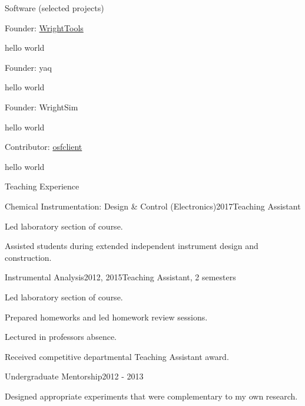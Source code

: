 \documentclass{resume}  %
\begin{document}
\begin{rSection}{Software (selected projects)}  %

\begin{rSubsection}{Founder: \href{http://wright.tools}{WrightTools}}{}{}{}
\item hello world
\end{rSubsection}

\begin{rSubsection}{Founder: yaq}{}{}{}
\item hello world
\end{rSubsection}

\begin{rSubsection}{Founder: WrightSim}{}{}{}
\item hello world
\end{rSubsection}

\begin{rSubsection}{Contributor: \href{https://github.com/dib-lab/osf-cli}{osfclient}}{}{}{}
\item hello world
\end{rSubsection}

\begin{rSection}{Teaching Experience}  %

\begin{rSubsection}{Chemical Instrumentation: Design \& Control (Electronics)}{2017}{Teaching Assistant}{}
\item Led laboratory section of course.
\item Assisted students during extended independent instrument design and construction.
\end{rSubsection}

\begin{rSubsection}{Instrumental Analysis}{2012, 2015}{Teaching Assistant, 2 semesters}{}
\item Led laboratory section of course.
\item Prepared homeworks and led homework review sessions.
\item Lectured in professors absence.
\item Received competitive departmental Teaching Assistant award.
\end{rSubsection}

\begin{rSubsection}{Undergraduate Mentorship}{2012 - 2013}{}{}
\item Designed appropriate experiments that were complementary to my own research.
\end{rSubsection}


\end{rSection}
\end{rSection}
\end{document}
